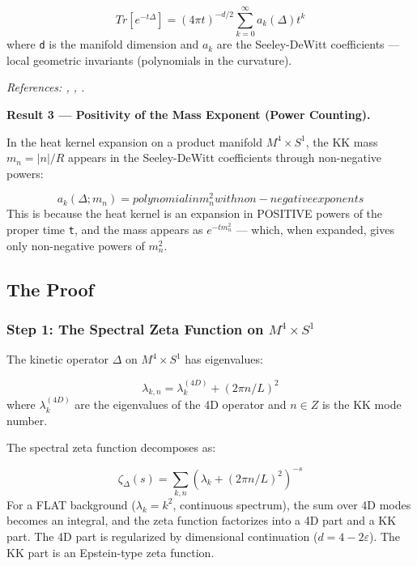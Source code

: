 \documentclass[aps,prd,preprint,superscriptaddress,longbibliography,floatfix]{revtex4-2}
\theoremstyle{remark}
\begin{document}
\begin{equation}
    Tr[e^{-t\Delta}] = (4\pi t)^{-d/2} \sum_{k=0}^{\infty} a_k(\Delta) t^k
\end{equation}
where \texttt{d} is the manifold dimension and $a_k$ are the Seeley-DeWitt coefficients --- local geometric invariants (polynomials in the curvature).

\textit{References: \cite{Seeley1967}, \cite{DeWitt1965}, \cite{Vassilevich2003}.}

\textbf{Result 3 --- Positivity of the Mass Exponent (Power Counting).}

In the heat kernel expansion on a product manifold $M^{4} \times S^{1}$, the KK mass $m_n = |n|/R$ appears in the Seeley-DeWitt coefficients through non-negative powers:


\begin{equation}
    a_k(\Delta; m_n) = polynomial in m_n^{2} with non-negative exponents
\end{equation}
This is because the heat kernel is an expansion in POSITIVE powers of the proper time \texttt{t}, and the mass appears as $e^{-tm_n^{2}}$ --- which, when expanded, gives only non-negative powers of $m_n^{2}$.



\subsection{The Proof}


\subsubsection{Step 1: The Spectral Zeta Function on $M^{4} \times S^{1}$}

The kinetic operator $\Delta$ on $M^{4} \times S^{1}$ has eigenvalues:


\begin{equation}
    \lambda_{k,n} = \lambda_k^{(4D)} + (2\pi n/L)^{2}
\end{equation}
where $\lambda_k^{(4D)}$ are the eigenvalues of the 4D operator and $n \in Z$ is the KK mode number.

The spectral zeta function decomposes as:


\begin{equation}
    \zeta_\Delta(s) = \sum_{k,n} (\lambda_k + (2\pi n/L)^{2})^{-s}
\end{equation}
For a FLAT background ($\lambda_k = k^{2}$, continuous spectrum), the sum over 4D modes becomes an integral, and the zeta function factorizes into a 4D part and a KK part. The 4D part is regularized by dimensional continuation ($d = 4 - 2\varepsilon$). The KK part is an Epstein-type zeta function.
\end{document}

